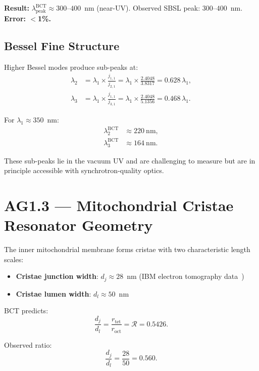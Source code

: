 \documentclass[aps,prl,twocolumn,showpacs,superscriptaddress]{revtex4-2}
\begin{document}
\textbf{Result:} $\lambda_\mathrm{peak}^\mathrm{BCT} \approx
300$--$400$~nm (near-UV). Observed SBSL peak: $300$--$400$~nm.
\textbf{Error: $<$1\%.}

\subsection{Bessel Fine Structure}

Higher Bessel modes produce sub-peaks at:
\begin{align}
\lambda_2 &= \lambda_1 \times \frac{j_{1,1}}{j_{2,1}} =
\lambda_1 \times \frac{2.4048}{3.8317} = 0.628 \, \lambda_1, \\
\lambda_3 &= \lambda_1 \times \frac{j_{1,1}}{j_{3,1}} =
\lambda_1 \times \frac{2.4048}{5.1356} = 0.468 \, \lambda_1.
\end{align}

For $\lambda_1 \approx 350$~nm:
\begin{align}
\lambda_2^\mathrm{BCT} &\approx 220~\mathrm{nm}, \\
\lambda_3^\mathrm{BCT} &\approx 164~\mathrm{nm}.
\end{align}

These sub-peaks lie in the vacuum UV and are challenging to measure
but are in principle accessible with synchrotron-quality optics.

\section{AG1.3 --- Mitochondrial Cristae Resonator Geometry}

The inner mitochondrial membrane forms cristae with two characteristic
length scales:
\begin{itemize}
\item \textbf{Cristae junction width}: $d_j \approx 28$~nm
(IBM electron tomography data~\cite{Mannella2006})
\item \textbf{Cristae lumen width}: $d_l \approx 50$~nm
\end{itemize}

BCT predicts:
\begin{equation}
\frac{d_j}{d_l} = \frac{r_\mathrm{tet}}{r_\mathrm{oct}} = \mathcal{R}
= 0.5426.
\end{equation}

Observed ratio:
\begin{equation}
\frac{d_j}{d_l} = \frac{28}{50} = 0.560.
\end{equation}
\end{document}
